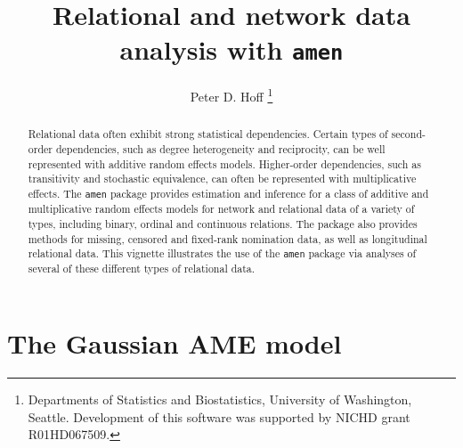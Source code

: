 \documentclass[11pt]{article}\usepackage[]{graphicx}\usepackage[]{color}
\begin{document}
\title{Relational and network data analysis with  {\tt amen}}
\author{Peter D. Hoff
\thanks{Departments of Statistics and Biostatistics, University of Washington, Seattle. Development of this software was supported  by
NICHD grant R01HD067509. } }
\maketitle

\begin{abstract}
Relational data often exhibit
strong statistical dependencies. Certain types of 
second-order dependencies, such as 
degree heterogeneity and reciprocity, can be well represented with 
additive random effects models. 
Higher-order dependencies, 
such as transitivity and stochastic equivalence, can often be represented with  multiplicative effects. 
The {\tt amen} package provides estimation and inference 
for a class of additive and multiplicative random effects models 
for network and relational data of a variety of types, 
including binary, ordinal and continuous 
relations. The package also provides methods 
for missing, censored and fixed-rank nomination data, as well 
as longitudinal relational data.  This vignette illustrates the 
use of the {\tt amen} package 
via analyses of several of these different types of relational data. 
\end{abstract}

\tableofcontents

\section{The Gaussian AME model}
\end{document}
